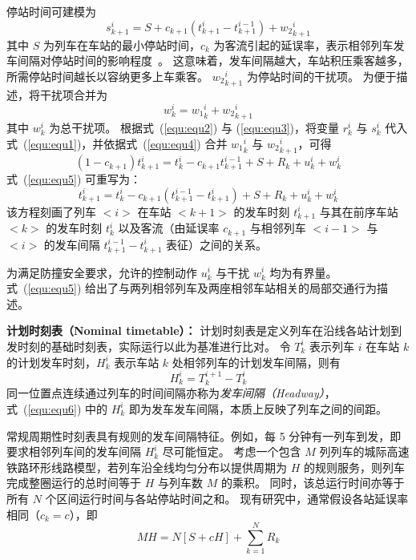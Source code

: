 停站时间可建模为
\begin{equation}
    s_{k+1}^{i}=S+c_{k+1}(t_{k+1}^{i}-t_{k+1}^{i-1})+{w_2}_{k+1}^{i}
    \label{equ:equ3}
\end{equation}
其中 $S$ 为列车在车站的最小停站时间，$c_k$ 为客流引起的延误率，表示相邻列车发车间隔对停站时间的影响程度~\cite{b11}。
这意味着，发车间隔越大，车站积压乘客越多，所需停站时间越长以容纳更多上车乘客。
${w_2}_{k+1}^{i}$ 为停站时间的干扰项。
为便于描述，将干扰项合并为
\begin{equation}
    w_{k}^{i}={w_1}_{k}^{i}+{w_2}_{k+1}^{i}
    \label{equ:equ4}
\end{equation}
其中 $w_{k}^{i}$ 为总干扰项。
根据式~(\ref{equ:equ2}) 与 (\ref{equ:equ3})，将变量 $r_k^i$ 与 $s_k^i$ 代入式~(\ref{equ:equ1})，并依据式~(\ref{equ:equ4}) 合并 ${w_1}_{k}^{i}$ 与 ${w_2}_{k+1}^{i}$，可得
\begin{equation}		
    (1-c_{k+1})t_{k+1}^{i}=t_{k}^{i}-c_{k+1}t_{k+1}^{i-1}+S+R_{k}+u_{k}^{i}+w_{k}^{i}
    \label{equ:equ5}
\end{equation}
式~(\ref{equ:equ5}) 可重写为：
\begin{equation*}
    t_{k+1}^i=t_k^i-c_{k+1}\left(t_{k+1}^{i-1}-t_{k+1}^i\right)+S+R_k+u_k^i+w_k^i
\end{equation*}
该方程刻画了列车 $<i>$ 在车站 $<k+1>$ 的发车时刻 $t_{k+1}^i$ 与其在前序车站 $<k>$ 的发车时刻 $t_k^i$ 以及客流（由延误率 $c_{k+1}$ 与相邻列车 $<i-1>$ 与 $<i>$ 的发车间隔 $t_{k+1}^{i-1}- t_{k+1}^i$ 表征）之间的关系。

为满足防撞安全要求，允许的控制动作 $u_{k}^{i}$ 与干扰 $w_{k}^{i}$ 均为有界量。
式~(\ref{equ:equ5}) 给出了与两列相邻列车及两座相邻车站相关的局部交通行为描述。

\textbf{计划时刻表（Nominal timetable）：}
计划时刻表是定义列车在沿线各站计划到发时刻的基础时刻表，实际运行以此为基准进行比对。
令 $T_{k}^{i}$ 表示列车 $i$ 在车站 $k$ 的计划发车时刻，$H_{k}^{i}$ 表示车站 $k$ 处相邻列车的计划发车间隔，则有
\begin{equation}
    H_{k}^{i}=T_{k}^{i+1}-T_{k}^{i}  
    \label{equ:equ6}
\end{equation}
同一位置点连续通过列车的时间间隔亦称为\emph{发车间隔（Headway）}，式~(\ref{equ:equ6}) 中的 $H_k^i$ 即为发车发车间隔，本质上反映了列车之间的间距。

常规周期性时刻表具有规则的发车间隔特征。例如，每 5 分钟有一列车到发，即要求相邻列车间的发车间隔 $H_k^i$ 尽可能恒定。
考虑一个包含 $M$ 列列车的城际高速铁路环形线路模型，若列车沿全线均匀分布以提供周期为 $H$ 的规则服务，则列车完成整圈运行的总时间等于 $H$ 与列车数 $M$ 的乘积。
同时，该总运行时间亦等于所有 $N$ 个区间运行时间与各站停站时间之和。
现有研究中，通常假设各站延误率相同（$c_{k}=c$），即
\begin{equation}
    MH=N[S+cH]+\sum_{k=1}^NR_{k}
    \label{equ:equ7}
\end{equation}

